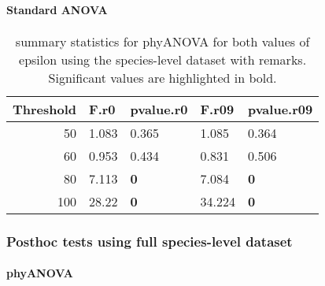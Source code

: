 \documentclass[]{article}
\let\oldparagraph\paragraph
\renewcommand{\paragraph}[1]{\oldparagraph{#1}\mbox{}}
\begin{document}
\hypertarget{standard-anova-2}{%
\paragraph{Standard ANOVA}\label{standard-anova-2}}

\begin{table}[H]

\caption{\label{tab:unnamed-chunk-13}summary statistics for phyANOVA for both values of epsilon using the species-level dataset with remarks. Significant values are highlighted in bold.}
\centering
\begin{tabular}{r|l|l|l|l}
\hline
Threshold & F.r0 & pvalue.r0 & F.r09 & pvalue.r09\\
\hline
50 & 1.083 & 0.365 & 1.085 & 0.364\\
\hline
60 & 0.953 & 0.434 & 0.831 & 0.506\\
\hline
80 & 7.113 & \textbf{0} & 7.084 & \textbf{0}\\
\hline
100 & 28.22 & \textbf{0} & 34.224 & \textbf{0}\\
\hline
\end{tabular}
\end{table}

\hypertarget{posthoc-tests-using-full-species-level-dataset}{%
\subsubsection{Posthoc tests using full species-level
dataset}\label{posthoc-tests-using-full-species-level-dataset}}

\hypertarget{phyanova-3}{%
\paragraph{phyANOVA}\label{phyanova-3}}
\end{document}
